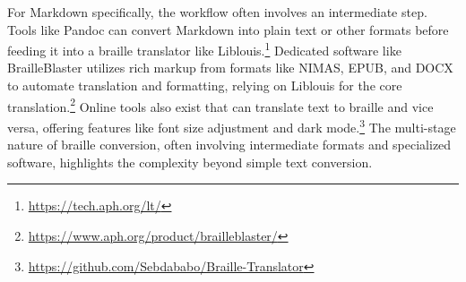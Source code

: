 For Markdown specifically, the workflow often involves an intermediate step. Tools like Pandoc can convert Markdown into plain text or other formats before feeding it into a braille translator like Liblouis.\footnote{\url{https://tech.aph.org/lt/}} Dedicated software like BrailleBlaster utilizes rich markup from formats like NIMAS, EPUB, and DOCX to automate translation and formatting, relying on Liblouis for the core translation.\footnote{\url{https://www.aph.org/product/brailleblaster/}} Online tools also exist that can translate text to braille and vice versa, offering features like font size adjustment and dark mode.\footnote{\url{https://github.com/Sebdababo/Braille-Translator}} The multi-stage nature of braille conversion, often involving intermediate formats and specialized software, highlights the complexity beyond simple text conversion.

